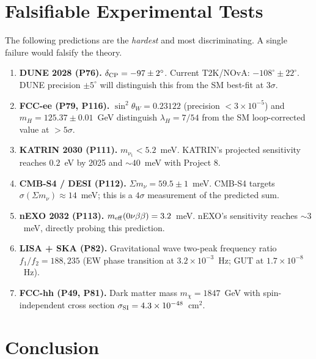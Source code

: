 \documentclass[12pt,a4paper]{article}
\begin{document}
\section{Falsifiable Experimental Tests}
\label{sec:tests}

The following predictions are the \emph{hardest} and most discriminating.
A single failure would falsify the theory.

\begin{enumerate}

  \item \textbf{DUNE 2028 (P76).}
  $\delta_{\rm CP} = -97 \pm 2^\circ$.
  Current T2K/NOvA: $-108^\circ\pm 22^\circ$. DUNE precision $\pm 5^\circ$
  will distinguish this from the SM best-fit at $3\sigma$.

  \item \textbf{FCC-ee (P79, P116).}
  $\sin^2\theta_W = 0.23122$ (precision $< 3\times10^{-5}$) and
  $m_H = 125.37 \pm 0.01$~GeV distinguish $\lambda_H = 7/54$ from the
  SM loop-corrected value at $> 5\sigma$.

  \item \textbf{KATRIN 2030 (P111).}
  $m_{\nu_1} < 5.2$~meV. KATRIN's projected sensitivity reaches
  $0.2$~eV by 2025 and $\sim 40$~meV with Project 8.

  \item \textbf{CMB-S4 / DESI (P112).}
  $\Sigma m_\nu = 59.5 \pm 1$~meV. CMB-S4 targets $\sigma(\Sigma m_\nu) \approx 14$~meV;
  this is a $4\sigma$ measurement of the predicted sum.

  \item \textbf{nEXO 2032 (P113).}
  $m_{\rm eff}(0\nu\beta\beta) = 3.2$~meV.
  nEXO's sensitivity reaches $\sim 3$~meV, directly probing this prediction.

  \item \textbf{LISA + SKA (P82).}
  Gravitational wave two-peak frequency ratio $f_1/f_2 = 188{,}235$
  (EW phase transition at $3.2\times10^{-3}$~Hz; GUT at $1.7\times10^{-8}$~Hz).

  \item \textbf{FCC-hh (P49, P81).}
  Dark matter mass $m_\chi = 1847$~GeV with spin-independent cross section
  $\sigma_{\rm SI} = 4.3\times10^{-48}$~cm$^2$.

\end{enumerate}

\section{Conclusion}
\label{sec:conclusion}
\end{document}
